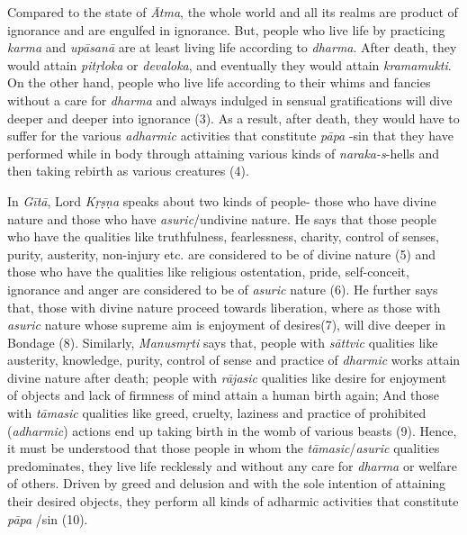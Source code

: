 Compared to the state of \emph{Ātma}, the whole world and all its realms are product of ignorance and are engulfed in ignorance. But, people who live life by practicing \emph{karma} and \emph{upāsanā} are at least living life according to \emph{dharma}. After death, they would attain \emph{pitṛloka} or \emph{devaloka}, and eventually they would attain \emph{kramamukti}. On the other hand, people who live life according to their whims and fancies without a care for \emph{dharma} and always indulged in sensual gratifications will dive deeper and deeper into ignorance (3). As a result, after death, they would have to suffer for the various \emph{adharmic} activities that constitute \emph{pāpa} -sin that they have performed while in body through attaining various kinds of \emph{naraka-s}-hells and then taking rebirth as various creatures (4).

In \emph{Gītā}, Lord \emph{Kṛṣṇa} speaks about two kinds of people- those who have divine nature and those who have \emph{asuric}/undivine nature. He says that those people who have the qualities like truthfulness, fearlessness, charity, control of senses, purity, austerity, non-injury etc. are considered to be of divine nature (5) and those who have the qualities like religious ostentation, pride, self-conceit, ignorance and anger are considered to be of \emph{asuric} nature (6). He further says that, those with divine nature proceed towards liberation, where as those with \emph{asuric} nature whose supreme aim is enjoyment of desires(7), will dive deeper in Bondage (8). Similarly, \emph{Manusmṛti} says that, people with \emph{sāttvic} qualities like austerity, knowledge, purity, control of sense and practice of \emph{dharmic} works attain divine nature after death; people with \emph{rājasic} qualities like desire for enjoyment of objects and lack of firmness of mind attain a human birth again; And those with \emph{tāmasic} qualities like greed, cruelty, laziness and practice of prohibited (\emph{adharmic}) actions end up taking birth in the womb of various beasts (9). Hence, it must be understood that those people in whom the \emph{tāmasic}/\emph{asuric} qualities predominates, they live life recklessly and without any care for \emph{dharma} or welfare of others. Driven by greed and delusion and with the sole intention of attaining their desired objects, they perform all kinds of adharmic activities that constitute \emph{pāpa} /sin (10).

